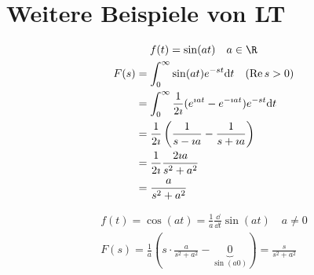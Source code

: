 \section{Weitere Beispiele von LT}
\begin{bsp}
	\begin{gather*}
		f(t) = \sin(at) \quad a \in \R \\
		\begin{split}
			F(s)
				&= \int_0^{\infty} \sin(at) e^{-st} \dd t \quad (\Re s > 0) \\
				&= \int_0^{\infty} \frac{1}{2\imath} (e^{\imath a t} - e^{-\imath a t} ) e^{-st} \dd t \\
				&= \frac{1}{2\imath} \left( \frac{1}{s - \imath a} - \frac{1}{s + \imath a} \right)  \\
				&= \frac{1}{2\imath} \frac{2\imath a}{s^2 + a^2} \\
				&= \frac{a}{s^2 + a^2}
		\end{split}
	\end{gather*}
\end{bsp}
\begin{bsp}
	\begin{gather*}
		f(t) = \cos(at) = \frac{1}{a} \frac{\dd}{\dd t} \sin(at) \quad a \neq 0 \\
		F(s) = \frac{1}{a} \left( s \cdot \frac{a}{s^2 + a^2} - \underbrace{0}_{\sin(a0)} \right) = \frac{s}{s^2 + a^2}
	\end{gather*}
\end{bsp}

